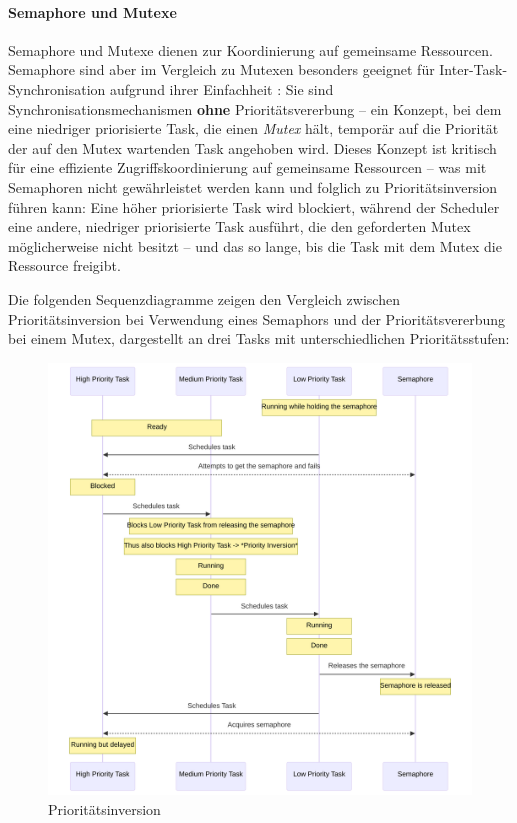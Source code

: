 \paragraph{Semaphore und Mutexe} \label{sec:mutex}

Semaphore und Mutexe dienen zur Koordinierung auf gemeinsame Ressourcen.
Semaphore sind aber im Vergleich zu Mutexen besonders geeignet für
Inter-Task-Synchronisation aufgrund ihrer Einfachheit
\cite{freertos_semphr_doc}: Sie sind Synchronisationsmechanismen \textbf{ohne}
Prioritätsvererbung -- ein Konzept, bei dem eine niedriger priorisierte Task,
die einen \textit{Mutex} hält, temporär auf die Priorität der auf den Mutex
wartenden Task angehoben wird. Dieses Konzept ist kritisch für eine effiziente
Zugriffskoordinierung auf gemeinsame Ressourcen -- was mit Semaphoren nicht
gewährleistet werden kann und folglich zu Prioritätsinversion führen kann: Eine
höher priorisierte Task wird blockiert, während der Scheduler eine andere,
niedriger priorisierte Task ausführt, die den geforderten Mutex möglicherweise
nicht besitzt -- und das so lange, bis die Task mit dem Mutex die Ressource
freigibt.

Die folgenden Sequenzdiagramme zeigen den Vergleich zwischen Prioritätsinversion
bei Verwendung eines Semaphors und der Prioritätsvererbung bei einem Mutex,
dargestellt an drei Tasks mit unterschiedlichen Prioritätsstufen:

\begin{figure}[H]
    \centering
    \includegraphics[width=1\textwidth]{assets/prio_inversion}
    \caption{Prioritätsinversion}
\end{figure}

